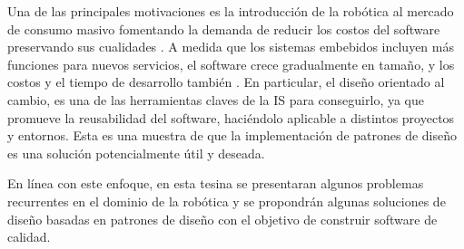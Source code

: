 Una de las principales motivaciones es la introducción de la robótica al mercado de consumo masivo fomentando la demanda de reducir los costos del software preservando sus cualidades \cite{Brugali2009}. A medida que los sistemas embebidos incluyen más funciones para nuevos servicios, el software crece gradualmente en tamaño, y los costos y el tiempo de desarrollo también \cite{model2}. En particular, el diseño orientado al cambio, es una de las herramientas claves de la IS para conseguirlo, ya que promueve la reusabilidad del software, haciéndolo aplicable a distintos proyectos y entornos. Esta es una muestra de que la implementación de patrones de diseño es una solución potencialmente útil y deseada.

En línea con este enfoque, en esta tesina se presentaran algunos problemas recurrentes en el dominio de la robótica y se propondrán algunas soluciones de diseño basadas en patrones de diseño con el objetivo de construir software de calidad.

